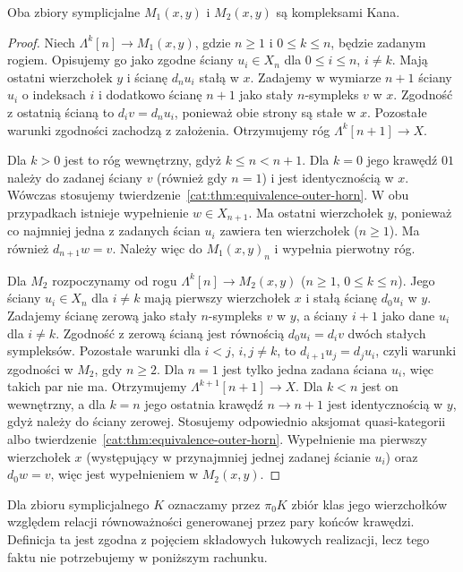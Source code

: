 \begin{twierdzenie}\label{cat:thm:quasicat-mapping-kan}
Oba zbiory symplicjalne $M_1(x,y)$ i $M_2(x,y)$ są kompleksami Kana.
\end{twierdzenie}
\begin{proof}
Niech $\Lambda^k[n]\to M_1(x,y)$, gdzie $n\geq1$ i $0\leq k\leq n$, będzie zadanym rogiem. Opisujemy go jako zgodne ściany $u_i\in X_n$ dla $0\leq i\leq n$, $i\ne k$. Mają ostatni wierzchołek $y$ i ścianę $d_nu_i$ stałą w $x$. Zadajemy w wymiarze $n+1$ ściany $u_i$ o indeksach $i$ i dodatkowo ścianę $n+1$ jako stały $n$-sympleks $v$ w $x$. Zgodność z ostatnią ścianą to $d_i v=d_nu_i$, ponieważ obie strony są stałe w $x$. Pozostałe warunki zgodności zachodzą z założenia. Otrzymujemy róg $\Lambda^k[n+1]\to X$.

Dla $k>0$ jest to róg wewnętrzny, gdyż $k\leq n<n+1$. Dla $k=0$ jego krawędź $01$ należy do zadanej ściany $v$ (również gdy $n=1$) i jest identycznością w $x$. Wówczas stosujemy twierdzenie~\ref{cat:thm:equivalence-outer-horn}. W obu przypadkach istnieje wypełnienie $w\in X_{n+1}$. Ma ostatni wierzchołek $y$, ponieważ co najmniej jedna z zadanych ścian $u_i$ zawiera ten wierzchołek ($n\geq1$). Ma również $d_{n+1}w=v$. Należy więc do $M_1(x,y)_n$ i wypełnia pierwotny róg.

Dla $M_2$ rozpoczynamy od rogu $\Lambda^k[n]\to M_2(x,y)$ ($n\geq1$, $0\leq k\leq n$). Jego ściany $u_i\in X_n$ dla $i\ne k$ mają pierwszy wierzchołek $x$ i stałą ścianę $d_0u_i$ w $y$. Zadajemy ścianę zerową jako stały $n$-sympleks $v$ w $y$, a ściany $i+1$ jako dane $u_i$ dla $i\ne k$. Zgodność z zerową ścianą jest równością $d_0u_i=d_iv$ dwóch stałych sympleksów. Pozostałe warunki dla $i<j$, $i,j\ne k$, to $d_{i+1}u_j=d_ju_i$, czyli warunki zgodności w $M_2$, gdy $n\geq2$. Dla $n=1$ jest tylko jedna zadana ściana $u_i$, więc takich par nie ma. Otrzymujemy $\Lambda^{k+1}[n+1]\to X$. Dla $k<n$ jest on wewnętrzny, a dla $k=n$ jego ostatnia krawędź $n\to n+1$ jest identycznością w $y$, gdyż należy do ściany zerowej. Stosujemy odpowiednio aksjomat quasi-kategorii albo twierdzenie~\ref{cat:thm:equivalence-outer-horn}. Wypełnienie ma pierwszy wierzchołek $x$ (występujący w przynajmniej jednej zadanej ścianie $u_i$) oraz $d_0w=v$, więc jest wypełnieniem w $M_2(x,y)$.
\end{proof}

Dla zbioru symplicjalnego $K$ oznaczamy przez $\pi_0K$ zbiór klas jego wierzchołków względem relacji równoważności generowanej przez pary końców krawędzi. Definicja ta jest zgodna z pojęciem składowych łukowych realizacji, lecz tego faktu nie potrzebujemy w poniższym rachunku.


